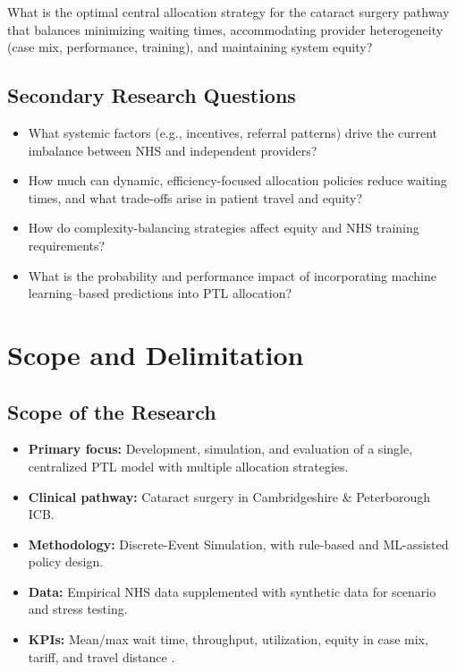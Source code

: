 \documentclass[ %
                    author={Nattanan Nawakitbamrung},
                supervisor={Dr. Sébastien Rochat},
                    degree={MSc},
                     title={Developing and Evaluating the Impact of a Single Patient Treatment List (PTL) for an NHS Integrated Care System},
                  subtitle={},
                      type={},
                      year={2025}]{dissertation}
\begin{document}
What is the optimal central allocation strategy for the cataract surgery pathway that balances minimizing waiting times, accommodating provider heterogeneity (case mix, performance, training), and maintaining system equity?
\noindent
\subsection{Secondary Research Questions}
\begin{itemize}
    \item What systemic factors (e.g., incentives, referral patterns) drive the current imbalance between NHS and independent providers?
    \item How much can dynamic, efficiency-focused allocation policies reduce waiting times, and what trade-offs arise in patient travel and equity?
    \item How do complexity-balancing strategies affect equity and NHS training requirements?
    \item What is the probability and performance impact of incorporating machine learning–based predictions into PTL allocation?
\end{itemize}

\noindent
\section{Scope and Delimitation}

\noindent
\subsection{Scope of the Research}
\begin{itemize}
    \item \textbf{Primary focus:} Development, simulation, and evaluation of a single, centralized PTL model with multiple allocation strategies.
    \item \textbf{Clinical pathway:} Cataract surgery in Cambridgeshire & Peterborough ICB.
    \item \textbf{Methodology:} Discrete-Event Simulation, with rule-based and ML-assisted policy design.
    \item \textbf{Data:} Empirical NHS data supplemented with synthetic data for scenario and stress testing.
    \item \textbf{KPIs:} Mean/max wait time, throughput, utilization, equity in case mix, tariff, and travel distance \cite{pandas_docs}.
\end{itemize}
\end{document}
